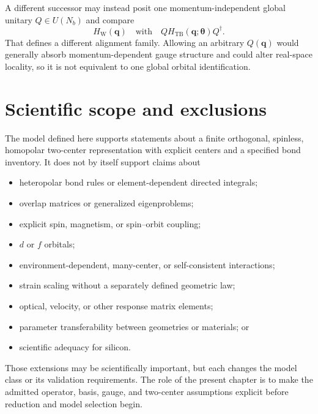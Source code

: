 A different successor may instead posit one momentum-independent global unitary
$Q\in U(N_b)$ and compare
\begin{equation}
  H_{\mathrm W}(\mathbf q)
  \quad\text{with}\quad
  QH_{\mathrm{TB}}(\mathbf q;\boldsymbol\theta)Q^{\dagger}.
\end{equation}
That defines a different alignment family. Allowing an arbitrary
$Q(\mathbf q)$ would generally absorb momentum-dependent gauge structure and
could alter real-space locality, so it is not equivalent to one global orbital
identification.

\section{Scientific scope and exclusions}

The model defined here supports statements about a finite orthogonal,
spinless, homopolar two-center representation with explicit centers and a
specified bond inventory. It does not by itself support claims about

\begin{itemize}
  \item heteropolar bond rules or element-dependent directed integrals;
  \item overlap matrices or generalized eigenproblems;
  \item explicit spin, magnetism, or spin--orbit coupling;
  \item $d$ or $f$ orbitals;
  \item environment-dependent, many-center, or self-consistent interactions;
  \item strain scaling without a separately defined geometric law;
  \item optical, velocity, or other response matrix elements;
  \item parameter transferability between geometries or materials; or
  \item scientific adequacy for silicon.
\end{itemize}

Those extensions may be scientifically important, but each changes the model
class or its validation requirements. The role of the present chapter is to
make the admitted operator, basis, gauge, and two-center assumptions explicit
before reduction and model selection begin.
